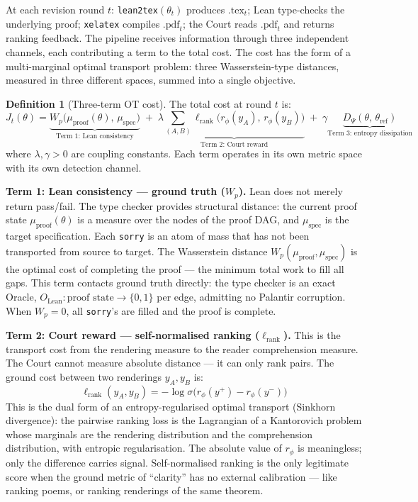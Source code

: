 \documentclass[11pt,a4paper]{article}
\theoremstyle{definition}
\newtheorem{definition}[theorem]{Definition}
\theoremstyle{remark}
\begin{document}
At each revision round $t$: \texttt{lean2tex}$(\theta_t)$ produces $\text{.tex}_t$; Lean type-checks the underlying proof; \texttt{xelatex} compiles $\text{.pdf}_t$; the Court reads $\text{.pdf}_t$ and returns ranking feedback. The pipeline receives information through three independent channels, each contributing a term to the total cost. The cost has the form of a multi-marginal optimal transport problem: three Wasserstein-type distances, measured in three different spaces, summed into a single objective.

\begin{definition}[Three-term OT cost]\label{def:ot_cost}
The total cost at round $t$ is:
\begin{equation}\label{eq:three_term}
  J_t(\theta) = \underbrace{W_p\bigl(\mu_{\mathrm{proof}}(\theta),\, \mu_{\mathrm{spec}}\bigr)}_{\text{Term 1: Lean consistency}} \;+\; \lambda \underbrace{\sum_{(A,B)} \ell_{\mathrm{rank}}\bigl(r_\phi(y_A),\, r_\phi(y_B)\bigr)}_{\text{Term 2: Court reward}} \;+\; \gamma \underbrace{D_\Psi(\theta,\, \theta_{\mathrm{ref}})}_{\text{Term 3: entropy dissipation}}
\end{equation}
where $\lambda, \gamma > 0$ are coupling constants. Each term operates in its own metric space with its own detection channel.
\end{definition}

\textbf{Term 1: Lean consistency --- ground truth ($W_p$).}
Lean does not merely return pass/fail. The type checker provides structural distance: the current proof state $\mu_{\mathrm{proof}}(\theta)$ is a measure over the nodes of the proof DAG, and $\mu_{\mathrm{spec}}$ is the target specification. Each \texttt{sorry} is an atom of mass that has not been transported from source to target. The Wasserstein distance $W_p(\mu_{\mathrm{proof}}, \mu_{\mathrm{spec}})$ is the optimal cost of completing the proof --- the minimum total work to fill all gaps. This term contacts ground truth directly: the type checker is an exact Oracle, $O_{\mathrm{Lean}}: \text{proof state} \to \{0, 1\}$ per edge, admitting no Palantir corruption. When $W_p = 0$, all \texttt{sorry}'s are filled and the proof is complete.

\textbf{Term 2: Court reward --- self-normalised ranking ($\ell_{\mathrm{rank}}$).}
This is the transport cost from the rendering measure to the reader comprehension measure. The Court cannot measure absolute distance --- it can only rank pairs. The ground cost between two renderings $y_A, y_B$ is:
\[
  \ell_{\mathrm{rank}}(y_A, y_B) = -\log\sigma\bigl(r_\phi(y^+) - r_\phi(y^-)\bigr)
\]
This is the dual form of an entropy-regularised optimal transport (Sinkhorn divergence): the pairwise ranking loss is the Lagrangian of a Kantorovich problem whose marginals are the rendering distribution and the comprehension distribution, with entropic regularisation. The absolute value of $r_\phi$ is meaningless; only the difference carries signal. Self-normalised ranking is the only legitimate score when the ground metric of ``clarity'' has no external calibration --- like ranking poems, or ranking renderings of the same theorem.
\end{document}
